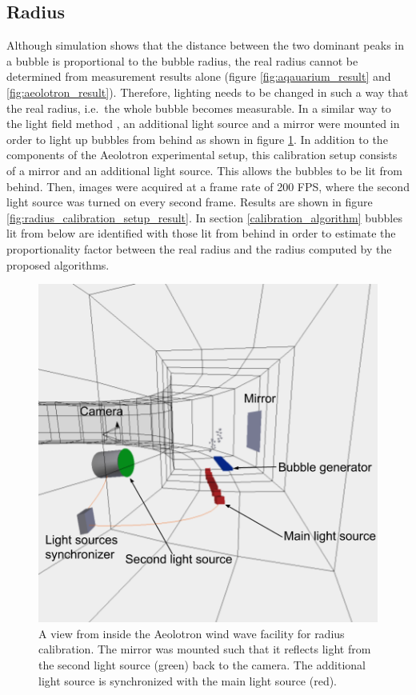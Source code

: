 		\subsection{Radius}\label{sub:radius_setup}
			Although simulation shows that the distance between the two dominant peaks in a bubble is proportional to the bubble radius, the real radius cannot be determined from measurement results alone (figure \ref{fig:aqauarium_result} and \ref{fig:aeolotron_result}). Therefore, lighting needs to be changed in such a way that the real radius, i.e.\ the whole bubble becomes measurable. In a similar way to the light field method \cite{MischlerDiss}, an additional light source and a mirror were mounted in order to light up bubbles from behind as shown in figure \ref{fig:radius_calibration_setup}. In addition to the components of the Aeolotron experimental setup, this calibration setup consists of a mirror and an additional light source. This allows the bubbles to be lit from behind. 
			Then, images were acquired at a frame rate of 200 FPS, where the second light source was turned on every second frame. Results are shown in figure \ref{fig:radius_calibration_setup_result}. In section \ref{calibration_algorithm} bubbles lit from below are identified with those lit from behind in order to estimate the proportionality factor between the real radius and the radius computed by the proposed algorithms. 
			

			\begin{figure}
				\includegraphics[scale=.5]{images/radius_setup_fancy.png}
				\caption{A view from inside the Aeolotron wind wave facility for radius calibration. The mirror was mounted such that it reflects light from the second light source (green) back to the camera. The additional light source is synchronized with the main light source (red).}
				\label{fig:radius_calibration_setup}
			\end{figure}
			
